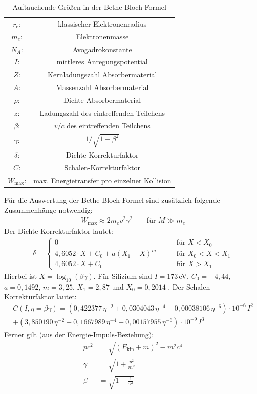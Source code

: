 \begin{table}[h]
	\centering
	\caption{Auftauchende Größen in der Bethe-Bloch-Formel}
	\begin{tabular}{cc}
		$r_e$: & klassischer Elektronenradius \\
		$m_e$: & Elektronenmasse \\
		$N_A$: & Avogadrokonstante \\
		$I$:  & mittleres Anregungspotential \\
		$Z$:  & Kernladungszahl Absorbermaterial \\
		$A$:  & Massenzahl Absorbermaterial \\
		$\rho$: & Dichte Absorbermaterial \\
		$z$:  & Ladungszahl des eintreffenden Teilchens \\
		$\beta$: & $v/c$ des eintreffenden Teilchens \\
		$\gamma$: & $1/\sqrt{1-\beta^2}$ \\
		$\delta$: & Dichte-Korrekturfaktor \\
		$C$:  & Schalen-Korrekturfaktor \\
		$W_\text{max}$: & max. Energietransfer pro einzelner Kollision \\
	\end{tabular}%
	\label{tab:bethebloch}%
\end{table}%

Für die Auswertung der Bethe-Bloch-Formel sind zusätzlich folgende Zusammenhänge notwendig:
\begin{align}
	W_\text{max}\approx 2m_ev^2\gamma^2\qquad\text{für }M\gg m_e
\end{align}
Der Dichte-Korrekturfaktor lautet:
\begin{align}
	\delta=\begin{cases}
	0 &\qquad\text{für }X<X_0\\
	4,6052\cdot X + C_0 + a(X_1-X)^m &\qquad\text{für }X_0<X<X_1\\
	4,6052\cdot X + C_0  &\qquad\text{für }X>X_1
	\end{cases}
\end{align}
Hierbei ist $X=\log_{10}(\beta \gamma)$. Für Silizium sind $I=173\,$eV, $C_0=-4,44$, $a=0,1492$, $m=3,25$, $X_1=2,87$ und $X_0=0,2014$ \cite{bethebloch}. Der  Schalen-Korrekturfaktor lautet:
\begin{align}
	C(I,\eta=\beta\gamma)=(0,422377\,\eta^{-2}+0,0304043\,\eta^{-4}-0,00038106\,\eta^{-6})\cdot 10^{-6}\,I^2 \nonumber\\
	+(3,850190\,\eta^{-2}-0,1667989\,\eta^{-4}+0,00157955\,\eta^{-6})\cdot 10^{-9}\,I^3
\end{align}
Ferner gilt (aus der Energie-Impuls-Beziehung):
\begin{align}
	pc^2&=\sqrt{(E_\text{kin}+m)^2-m^2c^4}\\
	\gamma &= \sqrt{1+\frac{p^2}{m^2}}\\
	\beta&=\sqrt{1-\frac{1}{\gamma^2}}
\end{align}

